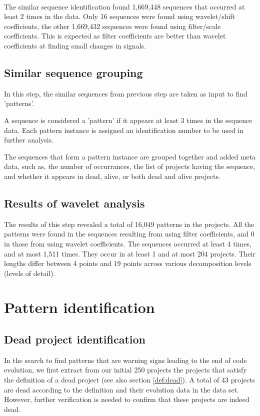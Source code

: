 \paragraph{}
The similar sequence identification found 1,669,448 sequences that occurred
at least 2 times in the data. Only 16 sequences were found using wavelet/shift
coefficients, the other 1,669,432 sequences were found using filter/scale
coefficients. This is expected as filter coefficients are better than wavelet
coefficients at finding small changes in signals.

\subsection{Similar sequence grouping}
\label{def:pattern}
In this step, the similar sequences from previous step are taken as input to
find 'patterns'.

A sequence is considered a 'pattern' if it appears at least 3 times in the
sequence data. Each pattern instance is assigned an identification number to be
used in further analysis.

The sequences that form a pattern instance are grouped together and added meta
data, such as, the number of occurrances, the list of projects having the
sequence, and whether it appears in dead, alive, or both dead and alive
projects.

\subsection{Results of wavelet analysis}
The results of this step revealed a total of 16,049 patterns in the projects.
All the patterns were found in the sequences resulting from using filter
coefficients, and 0 in those from using wavelet coefficients. The sequences
occurred at least 4 times, and at most 1,511 times. They occur in at least 1
and at most 204 projects. Their lengths differ between 4 points and 19 points
across various decomposition levels (levels of detail).

\section{Pattern identification}
\subsection{Dead project identification}
In the search to find patterns that are warning signs leading to the end of
code evolution, we first extract from our initial 250 projects the projects
that satisfy the definition of a dead project (see also section \ref{def:dead}).
A total of 43 projects are dead according to the definition and their evolution
data in the data set. However, further verification is needed to confirm that
these projects are indeed dead.

